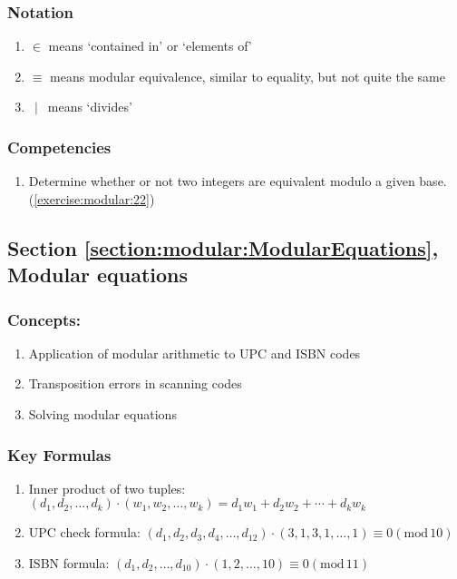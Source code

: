 \subsubsection*{Notation}
\begin{enumerate}
\item
$\in$  means `contained in' or `elements of'
\item 
$\equiv$  means modular equivalence, similar to equality, but not quite the same
\item 
$\,\mid\,$  means `divides'
\end{enumerate}


\subsubsection*{Competencies}
\begin{enumerate}
\item
Determine whether or not two integers are equivalent modulo a given base. (\ref{exercise:modular:22}) 
\end{enumerate}


\subsection*{Section \ref{section:modular:ModularEquations}, Modular equations}
\subsubsection*{Concepts:}
\begin{enumerate}
\item 
Application of modular arithmetic to UPC and ISBN codes
\item 
Transposition errors in scanning codes
\item
Solving modular equations
\end{enumerate}

\subsubsection*{Key Formulas}
\begin{enumerate}
\item
Inner product of two tuples: $(d_{1}, d_{2}, \dots, d_{k}) \cdot (w_{1}, w_{2}, \dots, w_{k}) = d_{1} w_{1} + d_{2}w_{2} + \cdots + d_{k}w_{k}$
\item    
UPC check formula: $(d_{1}, d_{2}, d_{3}, d_{4}, \dots, d_{12}) \cdot (3, 1, 3, 1, \dots, 1) \equiv 0 (\text{mod}\, 10)$
\item 
ISBN formula: $(d_{1}, d_{2}, \dots, d_{10}) \cdot (1, 2, \dots, 10) \equiv 0(\text{mod}\, 11)$


\end{enumerate}


